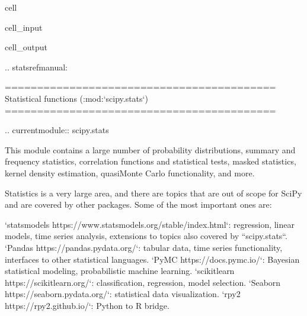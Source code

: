 \documentclass[letterpaper,10pt,english]{jupyterBook}
\begin{document}
\begin{sphinxuseclass}{cell}\begin{sphinxVerbatimInput}

\begin{sphinxuseclass}{cell_input}
\begin{sphinxVerbatim}[commandchars=\\\{\}]
   
\end{sphinxVerbatim}

\end{sphinxuseclass}\end{sphinxVerbatimInput}
\begin{sphinxVerbatimOutput}

\begin{sphinxuseclass}{cell_output}
\begin{sphinxVerbatim}[commandchars=\\\{\}]
.. \PYGZus{}statsrefmanual:

==========================================
Statistical functions (:mod:`scipy.stats`)
==========================================

.. currentmodule:: scipy.stats

This module contains a large number of probability distributions,
summary and frequency statistics, correlation functions and statistical
tests, masked statistics, kernel density estimation, quasi\PYGZhy{}Monte Carlo
functionality, and more.

Statistics is a very large area, and there are topics that are out of scope
for SciPy and are covered by other packages. Some of the most important ones
are:

\PYGZhy{} `statsmodels \PYGZlt{}https://www.statsmodels.org/stable/index.html\PYGZgt{}`\PYGZus{}\PYGZus{}:
  regression, linear models, time series analysis, extensions to topics
  also covered by ``scipy.stats``.
\PYGZhy{} `Pandas \PYGZlt{}https://pandas.pydata.org/\PYGZgt{}`\PYGZus{}\PYGZus{}: tabular data, time series
  functionality, interfaces to other statistical languages.
\PYGZhy{} `PyMC \PYGZlt{}https://docs.pymc.io/\PYGZgt{}`\PYGZus{}\PYGZus{}: Bayesian statistical
  modeling, probabilistic machine learning.
\PYGZhy{} `scikit\PYGZhy{}learn \PYGZlt{}https://scikit\PYGZhy{}learn.org/\PYGZgt{}`\PYGZus{}\PYGZus{}: classification, regression,
  model selection.
\PYGZhy{} `Seaborn \PYGZlt{}https://seaborn.pydata.org/\PYGZgt{}`\PYGZus{}\PYGZus{}: statistical data visualization.
\PYGZhy{} `rpy2 \PYGZlt{}https://rpy2.github.io/\PYGZgt{}`\PYGZus{}\PYGZus{}: Python to R bridge.



\end{sphinxVerbatim}
\end{sphinxuseclass}
\end{sphinxVerbatimOutput}
\end{sphinxuseclass}
\end{document}
